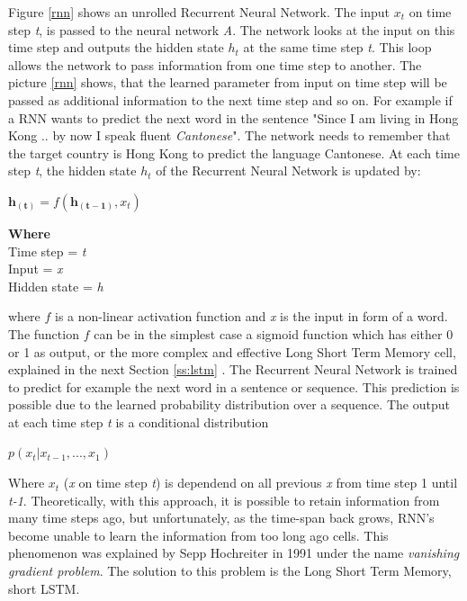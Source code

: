 Figure \ref{rnn} shows an unrolled Recurrent Neural Network. The input \(x_t\) on time step \textit{t}, is passed to the neural network \textit{A}. The network looks at the input on this time step and outputs the hidden state \(h_t\) at the same time step \textit{t}. This loop allows the network to pass information from one time step to another. The picture \ref{rnn} shows, that the learned parameter from input  on time step  will be passed as additional information to the next time step  and so on. For example if a RNN wants to predict the next word in the sentence "Since I am living in Hong Kong .. by now I speak fluent \textit{Cantonese}". The network needs to remember that the target country is Hong Kong to predict the language Cantonese. At each time step \textit{t}, the hidden state \textit{\(h_t\)} of the Recurrent Neural Network is updated by:

\begin{tcolorbox}
	\begin{center}
		\begin{math}
		\boldsymbol{h_{(t)}} = f(\boldsymbol{h_{(t-1)}}, x_{t})
		\end{math}
	\end{center}
\end{tcolorbox}

\begin{tcolorbox}
	\textbf{Where} \\
	Time step = \textit{t} \\
	Input =     \textit{x} \\
	Hidden state = \textit{h} 
\end{tcolorbox}


where \(f\) is a non-linear activation function and \textit{x} is the input in form of a word. The function \(f\) can be in the simplest case a sigmoid function which has either 0 or 1 as output, or the more complex and effective Long Short Term Memory cell, explained in the next Section \ref{ss:lstm} \cite{hochreiter1997long}. The Recurrent Neural Network is trained to predict for example the next word in a sentence or sequence. This prediction is possible due to the learned probability distribution over a sequence. The output at each time step \textit{t} is a conditional distribution

\begin{tcolorbox}
	\begin{center}
	 \(p(x_{t}|x_{t-1},...,x_{1})\)
	\end{center}
\end{tcolorbox}
Where \(x_{t}\) (\textit{x} on time step \textit{t}) is dependend on all previous \textit{x} from time step 1 until \textit{t-1}.
Theoretically, with this approach, it is possible to retain information from many time steps ago, but unfortunately, as the time-span back grows, RNN's become unable to learn the information from too long ago cells. This phenomenon was explained by Sepp Hochreiter in 1991 \cite{Hochreiter:91} under the name \textit{vanishing gradient problem}. The solution to this problem is the Long Short Term Memory, short LSTM.

